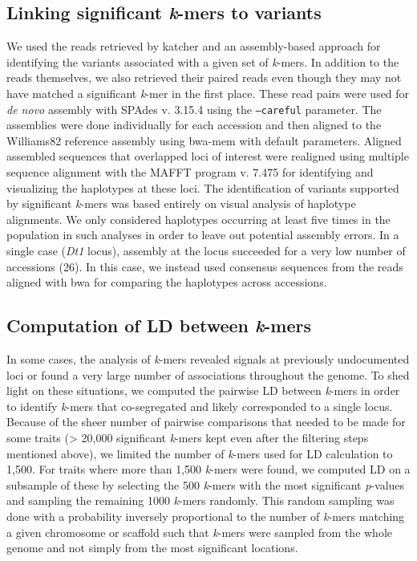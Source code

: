 \subsection*{Linking significant \emph{k}-mers to variants}
\label{sv-gwas-methods-linking-kmers}

We used the reads retrieved by katcher and an assembly-based approach for
identifying the variants associated with a given set of \emph{k}-mers. In
addition to the reads themselves, we also retrieved their paired reads even
though they may not have matched a significant \emph{k}-mer in the first place.
These read pairs were used for \emph{de novo} assembly with SPAdes v. 3.15.4
\citep{spades} using the \texttt{--careful} parameter. The assemblies were done
individually for each accession and then aligned to the Williams82 reference
assembly using bwa-mem with default parameters.  Aligned assembled sequences
that overlapped loci of interest were realigned using multiple sequence
alignment with the MAFFT program v. 7.475 \citep{katoh2002} for identifying and
visualizing the haplotypes at these loci. The identification of variants
supported by significant \textit{k}-mers was based entirely on visual analysis
of haplotype alignments. We only considered haplotypes occurring at least five
times in the population in such analyses in order to leave out potential
assembly errors. In a single case (\emph{Dt1} locus), assembly at the locus
succeeded for a very low number of accessions (26). In this case, we instead used
consensus sequences from the reads aligned with bwa for comparing the
haplotypes across accessions. 

\subsection*{Computation of LD between \emph{k}-mers}
\label{sv-gwas-ld-kmers}

In some cases, the analysis of \emph{k}-mers revealed signals at previously
undocumented loci or found a very large number of associations throughout the
genome. To shed light on these situations, we computed the pairwise LD between
\emph{k}-mers in order to identify \emph{k}-mers that co-segregated and
likely corresponded to a single locus. Because of the sheer number of pairwise
comparisons that needed to be made for some traits (> 20,000 significant
\emph{k}-mers kept even after the filtering steps mentioned above), we limited
the number of \emph{k}-mers used for LD calculation to 1,500. For traits where
more than 1,500 \emph{k}-mers were found, we computed LD on a subsample of
these by selecting the 500 \emph{k}-mers with the most significant
\emph{p}-values and sampling the remaining 1000 \emph{k}-mers randomly. This
random sampling was done with a probability inversely proportional to the
number of \emph{k}-mers matching a given chromosome or scaffold such that
\emph{k}-mers were sampled from the whole genome and not simply from the most
significant locations.

